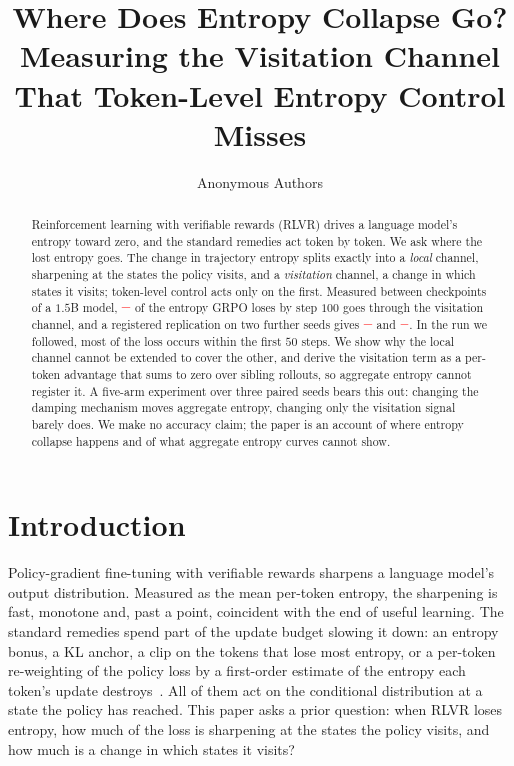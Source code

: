\documentclass[runningheads]{llncs}
\providecommand{\PENDING}{\textcolor{red}{\textbf{--}}}
\newcommand{\num}[1]{\ifcsname #1\endcsname\csname #1\endcsname\else\PENDING\fi}
\begin{document}
\title{Where Does Entropy Collapse Go?\\
Measuring the Visitation Channel That Token-Level Entropy Control Misses}
\author{Anonymous Authors}
\maketitle

\begin{abstract}
Reinforcement learning with verifiable rewards (RLVR) drives a language model's
entropy toward zero, and the standard remedies act token by token. We ask where the
lost entropy goes. The change in trajectory entropy splits exactly into a
\emph{local} channel, sharpening at the states the policy visits, and a
\emph{visitation} channel, a change in which states it visits; token-level control
acts only on the first. Measured between checkpoints of a $1.5$B model,
$\num{DecGrpoShare}$ of the entropy GRPO loses by step $100$ goes through the
visitation channel, and a registered replication on two further seeds gives
$\num{DecRepGrpoShare}$ and $\num{DecRepSignedShare}$. In the run we followed, most of
the loss occurs within the first $50$ steps. We show why the local channel cannot be
extended to cover the other, and derive the visitation term as a per-token advantage
that sums to zero over sibling rollouts, so aggregate entropy cannot register it. A
five-arm experiment over three paired seeds bears this out: changing the damping
mechanism moves aggregate entropy, changing only the visitation signal barely does.
We make no accuracy claim; the paper is an account of where entropy collapse happens
and of what aggregate entropy curves cannot show.
\end{abstract}

\section{Introduction}
\label{sec:intro}

Policy-gradient fine-tuning with verifiable rewards sharpens a language model's output
distribution. Measured as the mean per-token entropy, the sharpening is fast, monotone
and, past a point, coincident with the end of useful learning. The standard remedies
spend part of the update budget slowing it down: an entropy bonus, a KL anchor, a clip
on the tokens that lose most entropy, or a per-token re-weighting of the policy loss by
a first-order estimate of the entropy each token's update destroys~\cite{steer}. All of
them act on the conditional distribution at a state the policy has reached. This paper
asks a prior question: when RLVR loses entropy, how much of the loss is sharpening at
the states the policy visits, and how much is a change in which states it visits?
\end{document}
